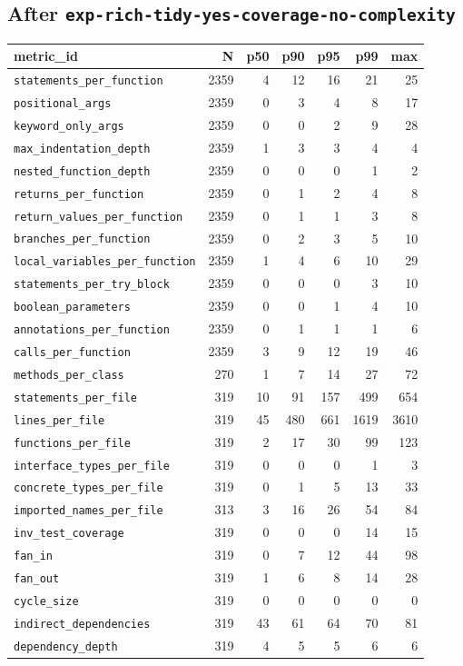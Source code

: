 \documentclass[11pt]{article}
\begin{document}
\subsection{After \texttt{exp-rich-tidy-yes-coverage-no-complexity}}
\label{app:kiss-yes-coverage-no-complexity}

{\scriptsize
\begin{longtable}{@{}lrrrrrr@{}}
  \toprule
  metric\_id & N & p50 & p90 & p95 & p99 & max \\
  \midrule
  \endhead
  \texttt{statements\_per\_function} & 2359 & 4 & 12 & 16 & 21 & 25 \\
  \texttt{positional\_args} & 2359 & 0 & 3 & 4 & 8 & 17 \\
  \texttt{keyword\_only\_args} & 2359 & 0 & 0 & 2 & 9 & 28 \\
  \texttt{max\_indentation\_depth} & 2359 & 1 & 3 & 3 & 4 & 4 \\
  \texttt{nested\_function\_depth} & 2359 & 0 & 0 & 0 & 1 & 2 \\
  \texttt{returns\_per\_function} & 2359 & 0 & 1 & 2 & 4 & 8 \\
  \texttt{return\_values\_per\_function} & 2359 & 0 & 1 & 1 & 3 & 8 \\
  \texttt{branches\_per\_function} & 2359 & 0 & 2 & 3 & 5 & 10 \\
  \texttt{local\_variables\_per\_function} & 2359 & 1 & 4 & 6 & 10 & 29 \\
  \texttt{statements\_per\_try\_block} & 2359 & 0 & 0 & 0 & 3 & 10 \\
  \texttt{boolean\_parameters} & 2359 & 0 & 0 & 1 & 4 & 10 \\
  \texttt{annotations\_per\_function} & 2359 & 0 & 1 & 1 & 1 & 6 \\
  \texttt{calls\_per\_function} & 2359 & 3 & 9 & 12 & 19 & 46 \\
  \texttt{methods\_per\_class} & 270 & 1 & 7 & 14 & 27 & 72 \\
  \texttt{statements\_per\_file} & 319 & 10 & 91 & 157 & 499 & 654 \\
  \texttt{lines\_per\_file} & 319 & 45 & 480 & 661 & 1619 & 3610 \\
  \texttt{functions\_per\_file} & 319 & 2 & 17 & 30 & 99 & 123 \\
  \texttt{interface\_types\_per\_file} & 319 & 0 & 0 & 0 & 1 & 3 \\
  \texttt{concrete\_types\_per\_file} & 319 & 0 & 1 & 5 & 13 & 33 \\
  \texttt{imported\_names\_per\_file} & 313 & 3 & 16 & 26 & 54 & 84 \\
  \texttt{inv\_test\_coverage} & 319 & 0 & 0 & 0 & 14 & 15 \\
  \texttt{fan\_in} & 319 & 0 & 7 & 12 & 44 & 98 \\
  \texttt{fan\_out} & 319 & 1 & 6 & 8 & 14 & 28 \\
  \texttt{cycle\_size} & 319 & 0 & 0 & 0 & 0 & 0 \\
  \texttt{indirect\_dependencies} & 319 & 43 & 61 & 64 & 70 & 81 \\
  \texttt{dependency\_depth} & 319 & 4 & 5 & 5 & 6 & 6 \\
  \bottomrule
\end{longtable}
}
\end{document}
